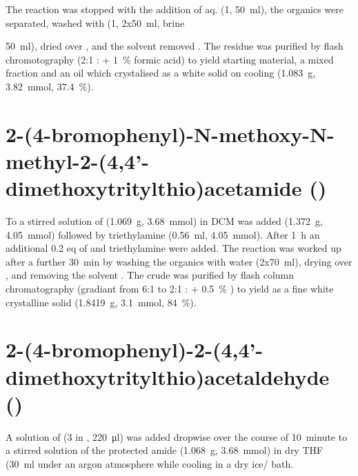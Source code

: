 The reaction was stopped with the addition of aq.  (\SI{1}{\Molar}, \SI{50}{\milli\litre}), the organics were separated, washed with  (\SI{1}{\Molar}, 2x\SI{50}{\milli\litre}, brine {\SI{50}{\milli\litre}), dried over , and the solvent removed \invacuo. The residue was purified by flash chromotography (2:1 : + \SI{1}{\percent} formic acid) to yield starting material, a mixed fraction and an oil which crystalised as a white solid  on cooling (\SI{1.083}{\gram}, \SI{3.82}{\milli\mol}, \SI{37.4}{\percent}).


\section{2-(4-bromophenyl)-N-methoxy-N-methyl-2-(4,4'-dimethoxytritylthio)acetamide ()}

To a stirred solution of  (\SI{1.069}{\gram}, \SI{3.68}{\milli\mol}) in DCM was added  (\SI{1.372}{\gram}, \SI{4.05}{\milli\mol}) followed by triethylamine (\SI{0.56}{\milli\litre}, \SI{4.05}{\milli\mol}). After \SI{1}{\hour} an additional 0.2 eq of  and triethylamine were added. The reaction was worked up after a further \SI{30}{\minute} by washing the organics with water (2x\SI{70}{\milli\litre}), drying over , and removing the solvent \invacuo. The crude was purified by flash column chromatography (gradiant from 6:1 to 2:1 : + \SI{0.5}{\percent} ) to yield  as a fine white crystalline solid (\SI{1.8419}{\gram}, \SI{3.1}{\milli\mol}, \SI{84}{\percent}).


\section{2-(4-bromophenyl)-2-(4,4'-dimethoxytritylthio)acetaldehyde ()}

A solution of  (\SI{3}{\Molar} in , \SI{220}{\micro\litre}) was added dropwise over the course of \SI{10}{minute} to a stirred solution of the protected amide  (\SI{1.068}{\gram}, \SI{3.68}{\milli\mol}) in dry THF (\SI{30}{\milli\litre} under an argon atmosphere while cooling in a dry ice/ bath.

}
